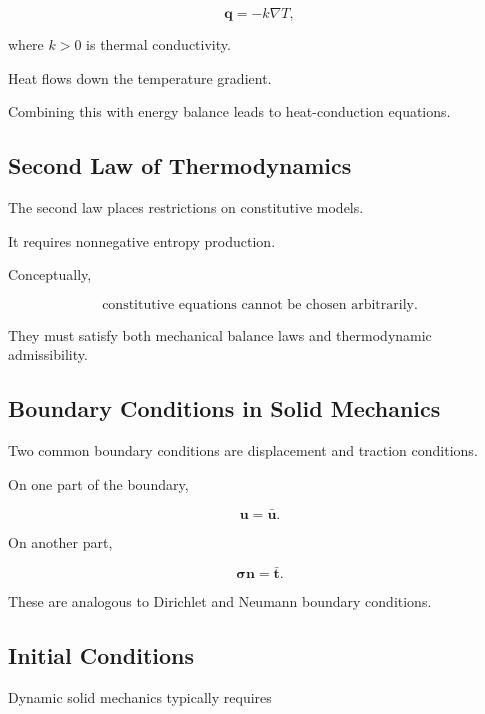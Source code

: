 \[
\boxed{
\mathbf{q}
=
-k\nabla T,
}
\]

where \(k>0\) is thermal conductivity.

Heat flows down the temperature gradient.

Combining this with energy balance leads to heat-conduction equations.

\subsection{Second Law of Thermodynamics}
\label{subsec:continuum-second-law}

The second law places restrictions on constitutive models.

It requires nonnegative entropy production.

Conceptually,

\[
\boxed{
\text{constitutive equations cannot be chosen arbitrarily}.
}
\]

They must satisfy both mechanical balance laws and thermodynamic
admissibility.

\subsection{Boundary Conditions in Solid Mechanics}
\label{subsec:solid-boundary-conditions}

Two common boundary conditions are displacement and traction conditions.

On one part of the boundary,

\[
\boxed{
\mathbf{u}
=
\bar{\mathbf{u}}.
}
\]

On another part,

\[
\boxed{
\boldsymbol{\sigma}\mathbf{n}
=
\bar{\mathbf{t}}.
}
\]

These are analogous to Dirichlet and Neumann boundary conditions.

\subsection{Initial Conditions}
\label{subsec:continuum-initial-conditions}

Dynamic solid mechanics typically requires

